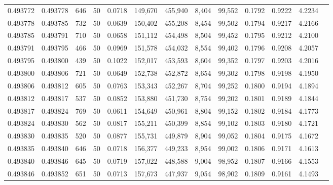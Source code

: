 \begin{tabular}{rrrrrrrrrrrrr}
0.493772 & 0.493778 &   646 &  50 &                                     0.0718 & 149,670 & 455,940 &   8,404 &  99,552 & 0.1792 & 0.9222 & 4.2234 \\
0.493778 & 0.493785 &   732 &  50 &                                     0.0639 & 150,402 & 455,208 &   8,454 &  99,502 & 0.1794 & 0.9217 & 4.2166 \\
0.493785 & 0.493791 &   710 &  50 &                                     0.0658 & 151,112 & 454,498 &   8,504 &  99,452 & 0.1795 & 0.9212 & 4.2100 \\
0.493791 & 0.493795 &   466 &  50 &                                     0.0969 & 151,578 & 454,032 &   8,554 &  99,402 & 0.1796 & 0.9208 & 4.2057 \\
0.493795 & 0.493800 &   439 &  50 &                                     0.1022 & 152,017 & 453,593 &   8,604 &  99,352 & 0.1797 & 0.9203 & 4.2016 \\
0.493800 & 0.493806 &   721 &  50 &                                     0.0649 & 152,738 & 452,872 &   8,654 &  99,302 & 0.1798 & 0.9198 & 4.1950 \\
0.493806 & 0.493812 &   605 &  50 &                                     0.0763 & 153,343 & 452,267 &   8,704 &  99,252 & 0.1800 & 0.9194 & 4.1894 \\
0.493812 & 0.493817 &   537 &  50 &                                     0.0852 & 153,880 & 451,730 &   8,754 &  99,202 & 0.1801 & 0.9189 & 4.1844 \\
0.493817 & 0.493824 &   769 &  50 &                                     0.0611 & 154,649 & 450,961 &   8,804 &  99,152 & 0.1802 & 0.9184 & 4.1773 \\
0.493824 & 0.493830 &   562 &  50 &                                     0.0817 & 155,211 & 450,399 &   8,854 &  99,102 & 0.1803 & 0.9180 & 4.1721 \\
0.493830 & 0.493835 &   520 &  50 &                                     0.0877 & 155,731 & 449,879 &   8,904 &  99,052 & 0.1804 & 0.9175 & 4.1672 \\
0.493835 & 0.493840 &   646 &  50 &                                     0.0718 & 156,377 & 449,233 &   8,954 &  99,002 & 0.1806 & 0.9171 & 4.1613 \\
0.493840 & 0.493846 &   645 &  50 &                                     0.0719 & 157,022 & 448,588 &   9,004 &  98,952 & 0.1807 & 0.9166 & 4.1553 \\
0.493846 & 0.493852 &   651 &  50 &                                     0.0713 & 157,673 & 447,937 &   9,054 &  98,902 & 0.1809 & 0.9161 & 4.1493 \\

\end{tabular}
